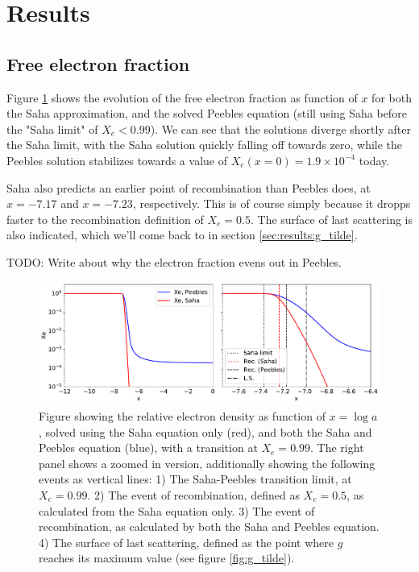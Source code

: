 \documentclass[10pt, a4paper]{article}
\begin{document}
\section{Results}
\subsection{Free electron fraction}
Figure \ref{fig:Xe} shows the evolution of the free electron fraction as function of $x$ for both the Saha approximation, and the solved Peebles equation (still using Saha before the "Saha limit" of $X_e < 0.99$). We can see that the solutions diverge shortly after the Saha limit, with the Saha solution quickly falling off towards zero, while the Peebles solution stabilizes towards a value of $X_e(x=0) = 1.9\times 10^{-4}$ today.

Saha also predicts an earlier point of recombination than Peebles does, at $x = -7.17$ and $x= - 7.23$, respectively. This is of course simply because it dropps faster to the recombination definition of $X_e = 0.5$. The surface of last scattering is also indicated, which we'll come back to in section \ref{sec:results:g_tilde}.

TODO: Write about why the electron fraction evens out in Peebles.


\begin{figure}[H]
    \centering
    \includegraphics[scale=0.5]{../m2_figs/Xe.pdf}
    \caption{Figure showing the relative electron density as function of $x=\log{a}$, solved using the Saha equation only (red), and both the Saha and Peebles equation (blue), with a transition at $X_e = 0.99$. The right panel shows a zoomed in version, additionally showing the following events as vertical lines: 1) The Saha-Peebles transition limit, at $X_e = 0.99$. 2) The event of recombination, defined as $X_e = 0.5$, as calculated from the Saha equation only. 3) The event of recombination, as calculated by both the Saha and Peebles equation. 4) The surface of last scattering, defined as the point where $g$ reaches its maximum value (see figure \ref{fig:g_tilde}).}
    \label{fig:Xe}
\end{figure}
\end{document}
